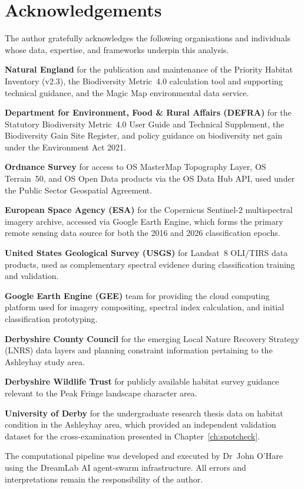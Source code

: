 \chapter*{Acknowledgements}

The author gratefully acknowledges the following organisations and individuals whose data, expertise, and frameworks underpin this analysis.

\textbf{Natural England} for the publication and maintenance of the Priority Habitat Inventory (v2.3), the Biodiversity Metric~4.0 calculation tool and supporting technical guidance, and the Magic Map environmental data service.

\textbf{Department for Environment, Food \& Rural Affairs (DEFRA)} for the Statutory Biodiversity Metric~4.0 User Guide and Technical Supplement, the Biodiversity Gain Site Register, and policy guidance on biodiversity net gain under the Environment Act 2021.

\textbf{Ordnance Survey} for access to OS MasterMap Topography Layer, OS Terrain~50, and OS Open Data products via the OS Data Hub API, used under the Public Sector Geospatial Agreement.

\textbf{European Space Agency (ESA)} for the Copernicus Sentinel-2 multispectral imagery archive, accessed via Google Earth Engine, which forms the primary remote sensing data source for both the 2016 and 2026 classification epochs.

\textbf{United States Geological Survey (USGS)} for Landsat~8 OLI/TIRS data products, used as complementary spectral evidence during classification training and validation.

\textbf{Google Earth Engine (GEE)} team for providing the cloud computing platform used for imagery compositing, spectral index calculation, and initial classification prototyping.

\textbf{Derbyshire County Council} for the emerging Local Nature Recovery Strategy (LNRS) data layers and planning constraint information pertaining to the Ashleyhay study area.

\textbf{Derbyshire Wildlife Trust} for publicly available habitat survey guidance relevant to the Peak Fringe landscape character area.

\textbf{University of Derby} for the undergraduate research thesis data on habitat condition in the Ashleyhay area, which provided an independent validation dataset for the cross-examination presented in Chapter~\ref{ch:spotcheck}.

The computational pipeline was developed and executed by Dr~John O'Hare using the DreamLab AI agent-swarm infrastructure. All errors and interpretations remain the responsibility of the author.
